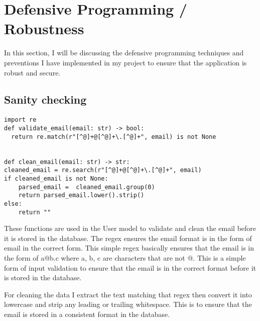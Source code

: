 \section{Defensive Programming / Robustness}
In this section, I will be discussing the defensive programming techniques and preventions I have implemented in my project to ensure that the application is robust and secure.

\subsection{Sanity checking}
\begin{verbatim}
import re
def validate_email(email: str) -> bool:
  return re.match(r"[^@]+@[^@]+\.[^@]+", email) is not None


def clean_email(email: str) -> str:
cleaned_email = re.search(r"[^@]+@[^@]+\.[^@]+", email)
if cleaned_email is not None:
    parsed_email =  cleaned_email.group(0)
    return parsed_email.lower().strip()
else:
    return ""
\end{verbatim}
These functions are used in the User model to validate and clean the email before it is stored in the database. The regex ensures the email format is in the form of email in the correct form. This simple regex basically ensures that the email is in the form of a@b.c where a, b, c are characters that are not @. This is a simple form of input validation to ensure that the email is in the correct format before it is stored in the database.

For cleaning the data I extract the text matching that regex then convert it into lowercase and strip any leading or trailing whitespace. This is to ensure that the email is stored in a consistent format in the database.

